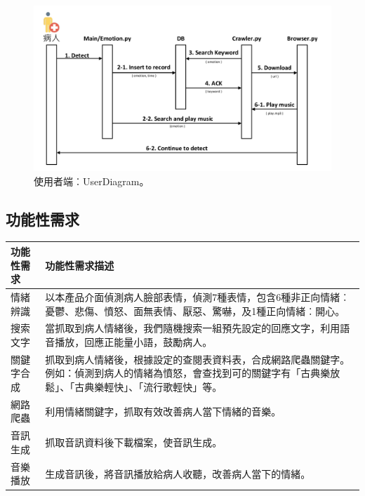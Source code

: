 \documentclass[12pt]{scrreprt}
\begin{document}
\begin{figure}[!h]
\begin{center}
\includegraphics[width=1\textwidth]{./figs/diagrams/user/client-UserDiagram.pdf}
\end{center}
\vspace{-0.5cm}
\caption{使用者端︰UserDiagram。}
\label{fig:client-UserDiagram}
\end{figure}

\subsection{功能性需求}

\begin{center}  
\begin{tabular}{|l| p{10cm}|}  
\hline  
功能性需求 & 功能性需求描述   \\ \hline  
情緒辨識 &以本產品介面偵測病人臉部表情，偵測7種表情，包含6種非正向情緒︰憂鬱、悲傷、憤怒、面無表情、厭惡、驚嚇，及1種正向情緒︰開心。    \\ \hline  
搜索文字&當抓取到病人情緒後，我們隨機搜索一組預先設定的回應文字，利用語音播放，回應正能量小語，鼓勵病人。\\\hline
關鍵字合成 & 抓取到病人情緒後，根據設定的查閱表資料表，合成網路爬蟲關鍵字。例如：偵測到病人的情緒為憤怒，會查找到可的關鍵字有「古典樂放鬆」、「古典樂輕快」、「流行歌輕快」等。    \\ \hline  
網路爬蟲 & 利用情緒關鍵字，抓取有效改善病人當下情緒的音樂。 \\ \hline
音訊生成 & 抓取音訊資料後下載檔案，使音訊生成。 \\ \hline
音樂播放 & 生成音訊後，將音訊播放給病人收聽，改善病人當下的情緒。 \\ \hline

\end{tabular}  
\end{center}  
\end{document}
